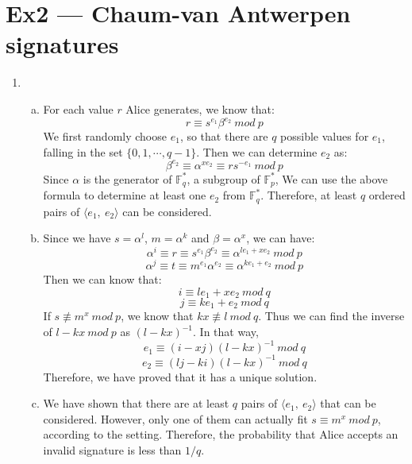 \documentclass[12pt, a4paper]{article}
\begin{document}
\section*{Ex2 --- Chaum-van Antwerpen signatures}
\begin{enumerate}
    \item \begin{enumerate}[a)]
        \item For each value $r$ Alice generates, we know that:
              $$r \equiv s^{e_1}\beta^{e_2}\ mod\ p$$
              We first randomly choose $e_1$, so that there are $q$ possible values for $e_1$, 
              falling in the set $\{0,1,\cdots,q-1\}$. Then we can determine $e_2$ as:
              $$\beta^{e_2} \equiv \alpha^{xe_2} \equiv rs^{-e_1}\ mod\ p$$
              Since $\alpha$ is the generator of $\mathbb{F}_q^*$, a subgroup of $\mathbb{F}_p^*$, 
              We can use the above formula to determine at least one $e_2$ from $\mathbb{F}_q^*$. 
              Therefore, at least $q$ ordered pairs of $\langle e_1,\ e_2 \rangle$ can be considered.
        \item Since we have $s = \alpha^l$, $m = \alpha^k$ and $\beta = \alpha^x$, we can have:
              $$\alpha^i \equiv r \equiv s^{e_1}\beta^{e_2} \equiv \alpha^{le_1 + xe_2}\ mod\ p$$
              $$\alpha^j \equiv t \equiv m^{e_1}\alpha^{e_2} \equiv \alpha^{ke_1 + e_2}\ mod\ p$$
              Then we can know that:
              $$i \equiv le_1 + xe_2\ mod\ q$$
              $$j \equiv ke_1 + e_2\ mod\ q$$
              If $s \not\equiv m^x\ mod\ p$, we know that $kx \not\equiv l\ mod\ q$. 
              Thus we can find the inverse of $l - kx\ mod\ p$ as $(l - kx)^{-1}$. In that way, 
              $$e_1 \equiv (i - xj)(l - kx)^{-1}\ mod\ q$$
              $$e_2 \equiv (lj - ki)(l - kx)^{-1}\ mod\ q$$
              Therefore, we have proved that it has a unique solution.
        \item We have shown that there are at least $q$ pairs of $\langle e_1,\ e_2 \rangle$ that can be considered. 
              However, only one of them can actually fit $s \equiv m^x\ mod\ p$, according to the setting. 
              Therefore, the probability that Alice accepts an invalid signature is less than $1/q$.
    \end{enumerate}


\end{enumerate}
\end{document}
